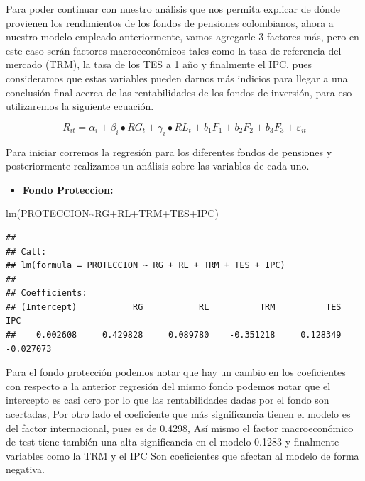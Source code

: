 \documentclass[
  12pt,
]{article}
\newenvironment{Shaded}{\begin{snugshade}}{\end{snugshade}}
\newcommand{\FunctionTok}[1]{\textcolor[rgb]{0.00,0.00,0.00}{#1}}
\newcommand{\NormalTok}[1]{#1}
\newcommand{\SpecialCharTok}[1]{\textcolor[rgb]{0.00,0.00,0.00}{#1}}
\providecommand{\tightlist}{%
  \setlength{\itemsep}{0pt}\setlength{\parskip}{0pt}}
\begin{document}
Para poder continuar con nuestro análisis que nos permita explicar de
dónde provienen los rendimientos de los fondos de pensiones colombianos,
ahora a nuestro modelo empleado anteriormente, vamos agregarle 3
factores más, pero en este caso serán factores macroeconómicos tales
como la tasa de referencia del mercado (TRM), la tasa de los TES a 1 año
y finalmente el IPC, pues consideramos que estas variables pueden darnos
más indicios para llegar a una conclusión final acerca de las
rentabilidades de los fondos de inversión, para eso utilizaremos la
siguiente ecuación.

\[
R_{it}=\alpha_i+\beta_i\bullet{RG}_t+\gamma_i\bullet{RL}_t+b_1F_1+b_2F_2+b_3F_3+\varepsilon_{it}
\]

Para iniciar corremos la regresión para los diferentes fondos de
pensiones y posteriormente realizamos un análisis sobre las variables de
cada uno.

\begin{itemize}
\tightlist
\item
  \textbf{Fondo Proteccion:}
\end{itemize}

\begin{Shaded}
\begin{Highlighting}[]
\FunctionTok{lm}\NormalTok{(PROTECCION}\SpecialCharTok{\textasciitilde{}}\NormalTok{RG}\SpecialCharTok{+}\NormalTok{RL}\SpecialCharTok{+}\NormalTok{TRM}\SpecialCharTok{+}\NormalTok{TES}\SpecialCharTok{+}\NormalTok{IPC)}
\end{Highlighting}
\end{Shaded}

\begin{verbatim}
## 
## Call:
## lm(formula = PROTECCION ~ RG + RL + TRM + TES + IPC)
## 
## Coefficients:
## (Intercept)           RG           RL          TRM          TES          IPC  
##    0.002608     0.429828     0.089780    -0.351218     0.128349    -0.027073
\end{verbatim}

Para el fondo protección podemos notar que hay un cambio en los
coeficientes con respecto a la anterior regresión del mismo fondo
podemos notar que el intercepto es casi cero por lo que las
rentabilidades dadas por el fondo son acertadas, Por otro lado el
coeficiente que más significancia tienen el modelo es del factor
internacional, pues es de 0.4298, Así mismo el factor macroeconómico de
test tiene también una alta significancia en el modelo 0.1283 y
finalmente variables como la TRM y el IPC Son coeficientes que afectan
al modelo de forma negativa.
\end{document}
